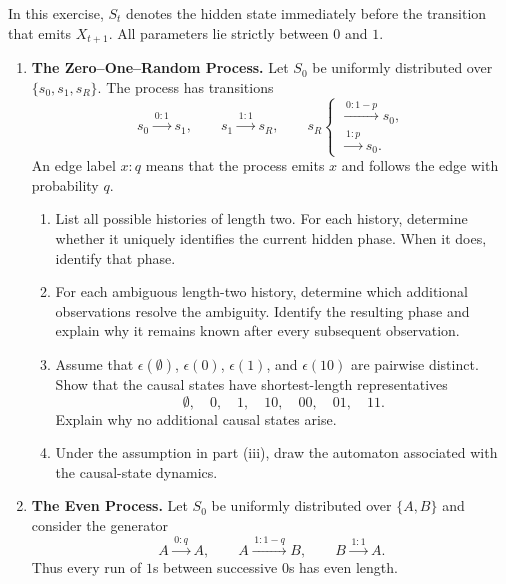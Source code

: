 \begin{exercise}
\label{ex:p2-3}
  In this exercise, $S_t$ denotes the hidden state immediately before the
  transition that emits $X_{t+1}$. All parameters lie strictly between $0$
  and $1$.

  \begin{enumerate}
    \item \textbf{The Zero--One--Random Process.}
      Let $S_0$ be uniformly distributed over
      $\{s_0,s_1,s_R\}$. The process has transitions
      \[
        s_0\xrightarrow{\,0:1\,}s_1,
        \qquad
        s_1\xrightarrow{\,1:1\,}s_R,
        \qquad
        s_R
        \begin{cases}
          \xrightarrow{\,0:1-p\,}s_0,\\[-1mm]
          \xrightarrow{\,1:p\,}s_0.
        \end{cases}
      \]
      An edge label $x:q$ means that the process emits $x$ and follows the
      edge with probability $q$.

      \begin{enumerate}
        \item List all possible histories of length two. For each history,
          determine whether it uniquely identifies the current hidden phase.
          When it does, identify that phase.

        \item For each ambiguous length-two history, determine which
          additional observations resolve the ambiguity. Identify the
          resulting phase and explain why it remains known after every
          subsequent observation.

        \item Assume that $\epsilon(\emptyset)$, $\epsilon(0)$,
          $\epsilon(1)$, and $\epsilon(10)$ are pairwise distinct. Show that
          the causal states have shortest-length representatives
          \[
            \emptyset,\quad 0,\quad 1,\quad 10,\quad 00,\quad 01,\quad 11.
          \]
          Explain why no additional causal states arise.

        \item Under the assumption in part (iii), draw the automaton
          associated with the causal-state dynamics.
      \end{enumerate}

    \item \textbf{The Even Process.}
      Let $S_0$ be uniformly distributed over $\{A,B\}$ and consider the
      generator
      \[
        A\xrightarrow{\,0:q\,}A,
        \qquad
        A\xrightarrow{\,1:1-q\,}B,
        \qquad
        B\xrightarrow{\,1:1\,}A.
      \]
      Thus every run of $1$s between successive $0$s has even length.


\end{enumerate}
\end{exercise}
